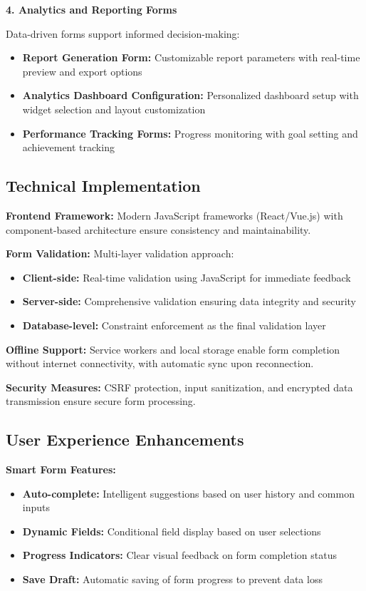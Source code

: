 \documentclass[12pt,a4paper,oneside]{book}
\begin{document}
\textbf{4. Analytics and Reporting Forms}

Data-driven forms support informed decision-making:

\begin{itemize}
    \item \textbf{Report Generation Form:} Customizable report parameters with real-time preview and export options
    \item \textbf{Analytics Dashboard Configuration:} Personalized dashboard setup with widget selection and layout customization
    \item \textbf{Performance Tracking Forms:} Progress monitoring with goal setting and achievement tracking
\end{itemize}

\subsection{Technical Implementation}

\textbf{Frontend Framework:} Modern JavaScript frameworks (React/Vue.js) with component-based architecture ensure consistency and maintainability.

\textbf{Form Validation:} Multi-layer validation approach:
\begin{itemize}
    \item \textbf{Client-side:} Real-time validation using JavaScript for immediate feedback
    \item \textbf{Server-side:} Comprehensive validation ensuring data integrity and security
    \item \textbf{Database-level:} Constraint enforcement as the final validation layer
\end{itemize}

\textbf{Offline Support:} Service workers and local storage enable form completion without internet connectivity, with automatic sync upon reconnection.

\textbf{Security Measures:} CSRF protection, input sanitization, and encrypted data transmission ensure secure form processing.

\subsection{User Experience Enhancements}

\textbf{Smart Form Features:}
\begin{itemize}
    \item \textbf{Auto-complete:} Intelligent suggestions based on user history and common inputs
    \item \textbf{Dynamic Fields:} Conditional field display based on user selections
    \item \textbf{Progress Indicators:} Clear visual feedback on form completion status
    \item \textbf{Save Draft:} Automatic saving of form progress to prevent data loss
\end{itemize}
\end{document}
